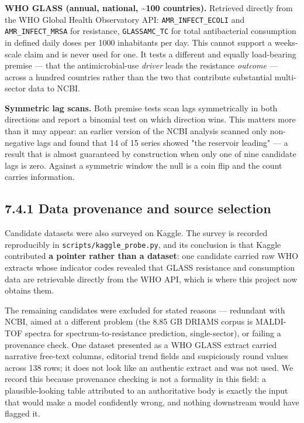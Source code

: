 \documentclass[11pt,a4paper]{article}
\begin{document}
\textbf{WHO GLASS (annual, national, \textasciitilde{}100 countries).} Retrieved directly from the WHO Global Health Observatory API: \texttt{AMR\_INFECT\_ECOLI} and \texttt{AMR\_INFECT\_MRSA} for resistance, \texttt{GLASSAMC\_TC} for total antibacterial consumption in defined daily doses per 1000 inhabitants per day. This cannot support a weeks-scale claim and is never used for one. It tests a different and equally load-bearing premise — that the antimicrobial-use \emph{driver} leads the resistance \emph{outcome} — across a hundred countries rather than the two that contribute substantial multi-sector data to NCBI.

\textbf{Symmetric lag scans.} Both premise tests scan lags symmetrically in both directions and report a binomial test on which direction wins. This matters more than it may appear: an earlier version of the NCBI analysis scanned only non-negative lags and found that 14 of 15 series showed "the reservoir leading" — a result that is almost guaranteed by construction when only one of nine candidate lags is zero. Against a symmetric window the null is a coin flip and the count carries information.

\subsection*{7.4.1 Data provenance and source selection}

Candidate datasets were also surveyed on Kaggle. The survey is recorded reproducibly in \texttt{scripts/kaggle\_probe.py}, and its conclusion is that Kaggle contributed \textbf{a pointer rather than a dataset}: one candidate carried raw WHO extracts whose indicator codes revealed that GLASS resistance and consumption data are retrievable directly from the WHO API, which is where this project now obtains them.

The remaining candidates were excluded for stated reasons — redundant with NCBI, aimed at a different problem (the 8.85 GB DRIAMS corpus is MALDI-TOF spectra for spectrum-to-resistance prediction, single-sector), or failing a provenance check. One dataset presented as a WHO GLASS extract carried narrative free-text columns, editorial trend fields and suspiciously round values across 138 rows; it does not look like an authentic extract and was not used. We record this because provenance checking is not a formality in this field: a plausible-looking table attributed to an authoritative body is exactly the input that would make a model confidently wrong, and nothing downstream would have flagged it.
\end{document}

